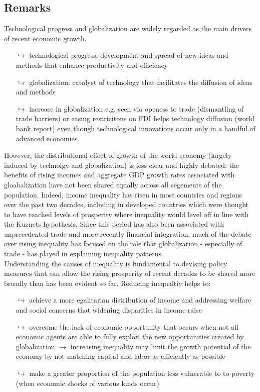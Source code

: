 \documentclass[a4paper,12pt]{scrartcl} %
\begin{document}
\subsection{Remarks}
Technological progress and globalization are widely regarded as the main drivers of recent economic growth.
\begin{itemize}
\item[$\hookrightarrow$] technological progress: development and spread of new ideas and methods that enhance productivity and efficiency
\item[$\hookrightarrow$] globalization: catalyst of technology that facilitates the diffusion of ideas and methods
\item[$\hookrightarrow$] increase in globalization e.g. seen via  openess to trade (dismantling of trade barriers) or easing restricitons on FDI helps technology diffusion (world bank report) even though technological innovations occur only in a handful of advanced economies
\end{itemize}
However, the distributional effect of growth of the world economy (largely induced by technolgy and globalization) is less clear and highly debated: the benefits of rising incomes and aggregate GDP growth rates associated with gloabalization have not been shared equally across all segements of the population. Indeed, income inequality has risen in most countries and regions over the past two decades, including in developed countries which were thought to have reached levels of prosperity where inequality would level off in line with the Kuznets hypothesis. Since this period has also been associated with unprecedented trade and more recently financial integration, much of the debate over rising inequality has focused on the role that globalization - especially of trade - has played in explaining inequality patterns.\\
Understanding the causes of inequality is fundamental to devising policy measures that can allow the rising prosperity of recent decades to be shared more broadly than has been evident so far. Reducing inequaltiy helps to:
\begin{itemize}
\item[$\hookrightarrow$] achieve a more egalitarian distribution of income and addressing welfare and social concerns that widening disparities in income raise
\item[$\hookrightarrow$] overcome the lack of economic opportunity that occurs when not all economic agents are able to fully exploit the new opportunities created by globalization $\rightarrow$ increasing inequality may limit the growth potential of the economy by not matching capital and labor as efficiently as possible
\item[$\hookrightarrow$] make a greater proportion of the population less vulnerable to to poverty (when economic shocks of various kinds occur)
\end{itemize}
%
%
%
%
%
\clearpage
\end{document}
